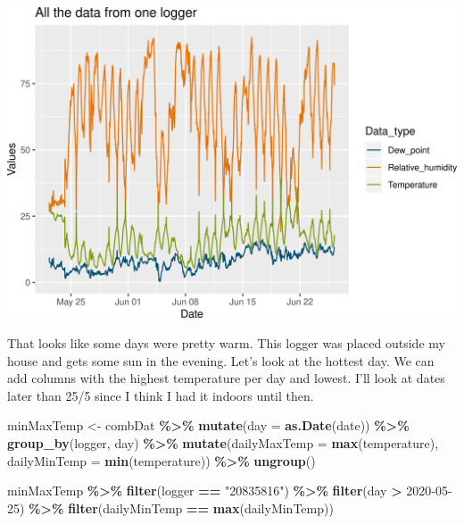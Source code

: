 \documentclass[]{article}
\newenvironment{Shaded}{\begin{snugshade}}{\end{snugshade}}
\newcommand{\DataTypeTok}[1]{\textcolor[rgb]{0.13,0.29,0.53}{#1}}
\newcommand{\KeywordTok}[1]{\textcolor[rgb]{0.13,0.29,0.53}{\textbf{#1}}}
\newcommand{\NormalTok}[1]{#1}
\newcommand{\OperatorTok}[1]{\textcolor[rgb]{0.81,0.36,0.00}{\textbf{#1}}}
\newcommand{\StringTok}[1]{\textcolor[rgb]{0.31,0.60,0.02}{#1}}
\begin{document}
\includegraphics{figure/unnamed-chunk-13-1.png}

That looks like some days were pretty warm. This logger was placed
outside my house and gets some sun in the evening. Let's look at the
hottest day. We can add columns with the highest temperature per day and
lowest. I'll look at dates later than 25/5 since I think I had it
indoors until then.

\begin{Shaded}
\begin{Highlighting}[]
\NormalTok{minMaxTemp <{-}}\StringTok{ }\NormalTok{combDat }\OperatorTok{\%>\%}\StringTok{ }
\StringTok{  }\KeywordTok{mutate}\NormalTok{(}\DataTypeTok{day =} \KeywordTok{as.Date}\NormalTok{(date)) }\OperatorTok{\%>\%}\StringTok{ }
\StringTok{  }\KeywordTok{group\_by}\NormalTok{(logger, day) }\OperatorTok{\%>\%}\StringTok{ }
\StringTok{  }\KeywordTok{mutate}\NormalTok{(}\DataTypeTok{dailyMaxTemp =} \KeywordTok{max}\NormalTok{(temperature),}
         \DataTypeTok{dailyMinTemp =} \KeywordTok{min}\NormalTok{(temperature)) }\OperatorTok{\%>\%}\StringTok{ }
\StringTok{  }\KeywordTok{ungroup}\NormalTok{()}


\NormalTok{minMaxTemp }\OperatorTok{\%>\%}\StringTok{ }
\StringTok{  }\KeywordTok{filter}\NormalTok{(logger }\OperatorTok{==}\StringTok{ "20835816"}\NormalTok{) }\OperatorTok{\%>\%}
\StringTok{  }\KeywordTok{filter}\NormalTok{(day }\OperatorTok{>}\StringTok{ \textquotesingle{}2020{-}05{-}25\textquotesingle{}}\NormalTok{) }\OperatorTok{\%>\%}\StringTok{ }
\StringTok{  }\KeywordTok{filter}\NormalTok{(dailyMinTemp }\OperatorTok{==}\StringTok{ }\KeywordTok{max}\NormalTok{(dailyMinTemp))}
\end{Highlighting}
\end{Shaded}
\end{document}
